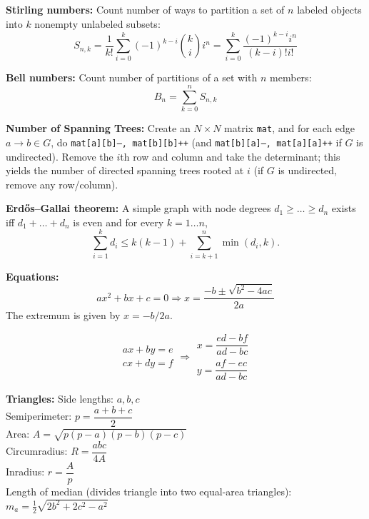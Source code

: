 \noindent
\textbf{Stirling numbers:}
\noindent
Count number of ways to partition a set of $n$ labeled objects into $k$ nonempty unlabeled subsets:
\[ S_{n,k}= \frac{1}{k!} \sum_{i=0}^{k}(-1)^{k-i}\binom{k}{i} i^n =  \sum_{i=0}^{k}\frac{(-1)^{k-i} i^n}{(k-i)!i!} \]

\noindent
\textbf{Bell numbers:}
\noindent
Count number of partitions of a set with $n$ members:
\[ B_n = \sum_{k=0}^{n} S_{n,k} \]

\noindent
\textbf{Number of Spanning Trees:}
\noindent
Create an $N\times N$ matrix \texttt{mat}, and for each edge $a \rightarrow b \in G$, do
\texttt{mat[a][b]--, mat[b][b]++} (and \texttt{mat[b][a]--, mat[a][a]++} if $G$ is undirected).
Remove the $i$th row and column and take the determinant; this yields the number of directed spanning trees rooted at $i$
(if $G$ is undirected, remove any row/column).

\noindent
\textbf{Erdős–Gallai theorem:}
\noindent
A simple graph with node degrees $d_1 \ge \dots \ge d_n$ exists iff $d_1 + \dots + d_n$ is even and for every $k = 1\dots n$,
\[ \sum _{i=1}^{k}d_{i}\leq k(k-1)+\sum _{i=k+1}^{n}\min(d_{i},k). \]

\noindent
\textbf{Equations:}
\[ax^2+bx+c=0 \Rightarrow x = \frac{-b\pm\sqrt{b^2-4ac}}{2a}\]
\noindent
The extremum is given by $x = -b/2a$.

\[\begin{aligned}ax+by=e\\cx+dy=f\end{aligned}
\Rightarrow
\begin{aligned}x=\dfrac{ed-bf}{ad-bc}\\y=\dfrac{af-ec}{ad-bc}\end{aligned}\]

\noindent
\textbf{Triangles:}
\noindent
Side lengths: $a,b,c$\\
Semiperimeter: $p=\dfrac{a+b+c}{2}$\\
Area: $A=\sqrt{p(p-a)(p-b)(p-c)}$\\
Circumradius: $R=\dfrac{abc}{4A}$\\
Inradius: $r=\dfrac{A}{p}$\\
Length of median (divides triangle into two equal-area triangles): $m_a=\tfrac{1}{2}\sqrt{2b^2+2c^2-a^2}$\\

